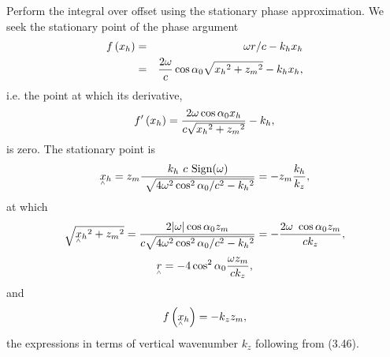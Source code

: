 Perform the integral over offset using the stationary phase approximation. We seek the stationary point of the phase argument
\begin{eqnarray}\text{\textit{$f$}}\left(\text{\textit{$x_h$}}\right) & = & \omega  \text{\textit{$r / c$}} -\text{\textit{$ $}}\text{\textit{$k_hx_h$}}\nonumber\\
& = & \frac{2\omega  }{\text{\textit{$c$}}}\cos  \alpha _0 \sqrt{\text{\textit{$x_h$}}{}^2+\text{\textit{$z_m$}}{}^2}-\text{\textit{$ $}}\text{\textit{$k_hx_h$}}\text{\textit{$,$}}\end{eqnarray}
i.e. the point at which its derivative,
\begin{equation}\text{\textit{$f'$}}\left(\text{\textit{$x_h$}}\right)=\frac{2\omega  \cos  \alpha _0\text{\textit{$ $}}\text{\textit{$x_h$}}}{\text{\textit{$
$}}\text{\textit{$c$}}\text{\textit{$ $}}\sqrt{\text{\textit{$x_h$}}{}^2+\text{\textit{$z_m$}}{}^2}} -\text{\textit{$ $}}\text{\textit{$k_h$}}\text{\textit{$,$}}\end{equation}
is zero. The stationary point is
\begin{equation}\text{\textit{$ $}}\text{\textit{$\underset{{}^{\wedge}}{x}{}_h$}} =\text{\textit{$z_m$}}\frac{\text{\textit{$ $}}\text{\textit{$k_h$}}\text{\textit{
 }}\text{\textit{$c$}}\ \text{\textit{$ $}}\text{Sign}\text{\textit{$($}}\omega )}{\text{  }\sqrt{4\omega ^2\cos ^2\alpha _0/\text{\textit{$c$}}^2-\text{\textit{$k_h$}}{}^2}}\text{\textit{$
$}}=\text{\textit{$-z_m$}}\frac{\text{\textit{$ k_h $}}}{\text{\textit{$k_z$}}},\end{equation}
at which
\begin{equation}\sqrt{\text{\textit{$\underset{{}^{\wedge}}{x}{}_h$}}{}^2+\text{\textit{$z_m$}}{}^2} =\text{\textit{$\frac{2|\omega |\cos  \alpha
_0 \text{\textit{$z_m$}}}{\text{\textit{$c$}} \sqrt{4\omega ^2\cos ^2\alpha _0/\text{\textit{$c$}}^2-\text{\textit{$k_h$}}{}^2}}$}}\text{\textit{$
$}}=-\frac{2 \omega \text{  }\cos  \alpha _0 \text{\textit{$z_m$}}}{\text{\textit{$c k_z$}}}\text{\textit{$,$}}\end{equation}
\begin{equation}\text{\textit{$\underset{{}^{\wedge}}{\text{\textit{$r$}}}$}}=-4\cos ^2 \alpha _0\text{\textit{$\frac{\omega  \text{\textit{$z_m$}}}{\text{\textit{$c
k_z$}}}$}},\end{equation}
and
\begin{equation}\text{\textit{$f$}}\left(\text{\textit{$\underset{{}^{\wedge}}{x}{}_h$}}\right)=\text{\textit{$ $}}\text{\textit{$-$}}\text{\textit{$k$}}_{\text{\textit{$z$}}}\text{\textit{$z_m$}}\text{\textit{$,$}}\end{equation}
the expressions in terms of vertical wavenumber \(k_z\) following from (3.46).

